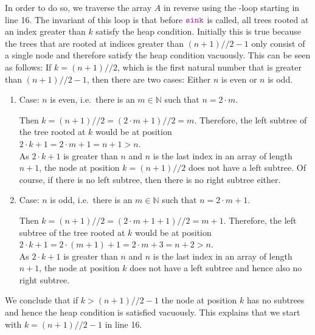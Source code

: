 \begin{enumerate}
\begin{enumerate}
            In order to do so, we traverse the array ${A}$ in reverse using the
            -loop starting in line 16.  The invariant of this loop is that before
            $\mytt{sink}$ is called, all trees rooted at an index greater than 
            ${k}$ satisfy the heap condition.  Initially this is true because the trees that
            are rooted at indices greater than  $(n + 1) // 2 - 1$  only
            consist of a single node and therefore satisfy the heap condition vacuously.  This can be seen as
            follows:  If $k = (n + 1)//2$, which is the first 
            natural number that is greater than $(n + 1) // 2 - 1$, then there are two cases:
            Either $n$ is even or $n$ is odd.
            \begin{enumerate}
            \item Case: $n$ is even, i.e.~there is an $m\in \mathbb{N}$ such that $n = 2 \cdot m$.

                  Then $k = (n + 1)//2 = (2 \cdot m + 1) // 2 = m$.  Therefore, the left subtree of the tree 
                  rooted at $k$ would be at position 
                  \\[0.2cm]
                  \hspace*{1.3cm}
                  $2 \cdot k + 1 = 2 \cdot m + 1 = n + 1 > n$.
                  \\[0.2cm]
                  As $2 \cdot k  + 1$ is greater than $n$ and $n$ is the last index in an array of length $n+1$, the
                  node at position $k = (n+1)//2$ does not have a left subtree.
                  Of course, if there is no left subtree, then there is no right subtree either.
            \item Case: $n$ is odd, i.e.~there is an $m \in \mathbb{N}$ such that $n = 2 \cdot m + 1$.

                  Then $k = (n + 1)//2 = (2 \cdot m + 1 + 1) // 2 = m + 1$.  Therefore, the left subtree
                  of the tree rooted at $k$ would be at position
                  \\[0.2cm]
                  \hspace*{1.3cm}
                  $2 \cdot k + 1 = 2 \cdot (m + 1) + 1 = 2 \cdot m + 3 = n + 2 > n$.
                  \\[0.2cm]
                  As $2 \cdot k + 1$ is greater than $n$ and $n$ is the last index in an array of length $n+1$, 
                  the node at position $k$ does not have a left subtree and hence also no right subtree. 
            \end{enumerate}
            We conclude that if $k > (n + 1)//2 - 1$ the node at position $k$ has no subtrees and hence the heap
            condition is satisfied vacuously.   This explains that we start with $k = (n+1)//2 - 1$ in line 16.
            

\end{enumerate}
\end{enumerate}
